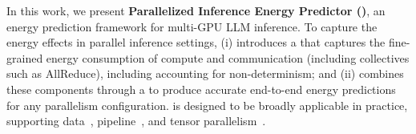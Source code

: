 \noindent In this work, we present \textbf{Parallelized Inference Energy Predictor (\sys{})}, an energy prediction framework for multi-GPU LLM inference. 
To capture the energy effects in parallel inference settings,
\sys{} (i) introduces a  that captures the fine-grained energy consumption of compute and communication (including collectives such as AllReduce), including accounting for non-determinism; and (ii) combines these components through a  to produce accurate end-to-end energy predictions for any parallelism configuration. \sys{} is designed to be broadly applicable in practice, supporting data~\cite{data-parallel}, pipeline~\cite{sangjin23_envpipe}, and tensor parallelism~\cite{megatron}.

